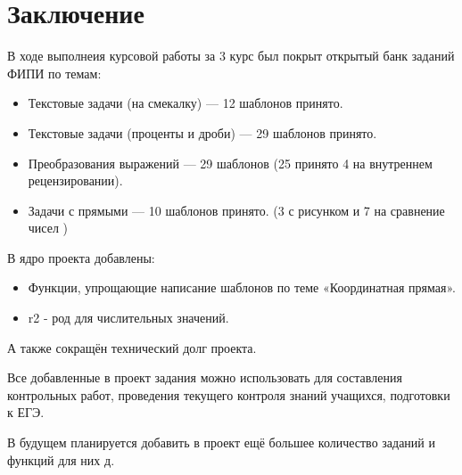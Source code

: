 \section*{Заключение}
В ходе выполнеия курсовой работы за 3 курс был покрыт открытый банк заданий ФИПИ по темам:
		      \begin{itemize}
			      \item Текстовые задачи (на смекалку) — 12 шаблонов принято.
			      \item Текстовые задачи (проценты и дроби) — 29 шаблонов принято.
			      \item Преобразования выражений — 29 шаблонов (25 принято 4 на внутреннем рецензировании).
			      \item Задачи с прямыми — 10 шаблонов принято. (3 с рисунком и 7 на сравнение чисел )
		      \end{itemize}

В ядро проекта добавлены: 
\begin{itemize}
    \item Функции, упрощающие написание шаблонов по теме «Координатная прямая».
    \item r2 - род для числительных значений.
\end{itemize}

А также сокращён технический долг проекта.

Все добавленные в проект задания можно использовать для составления контрольных работ, проведения текущего контроля знаний учащихся, подготовки к ЕГЭ.~\cite{chas-ege}

В будущем планируется добавить в проект ещё большее количество заданий и функций для них д.


